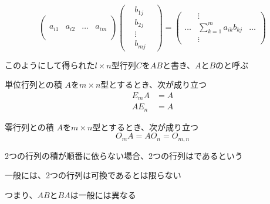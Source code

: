 \documentclass[../../../topic_linear-map]{subfiles}
\begin{document}
\begin{equation*}
  \begin{pmatrix}
           &        &       &        \\
           &        &       &        \\
    a_{i1} & a_{i2} & \dots & a_{im} \\
           &        &       &        \\
           &        &       &
  \end{pmatrix}
  \begin{pmatrix}
     & b_{1j} & \\
     & b_{2j} & \\
     & \vdots & \\
     & b_{mj} &
  \end{pmatrix} = \begin{pmatrix}
          & \vdots                                  &       \\
    \dots & \displaystyle\sum_{k=1}^m a_{ik} b_{kj} & \dots \\
          & \vdots                                  &
  \end{pmatrix}
\end{equation*}

\br

このようにして得られた$l \times n$型行列$C$を$AB$と書き、$A$と$B$のと呼ぶ

\sectionline

\begin{theorem}{単位行列との積}
  $A$を$m \times n$型とするとき、次が成り立つ
  \begin{align*}
    E_mA & = A \\
    AE_n & = A
  \end{align*}
\end{theorem}

\begin{theorem}{零行列との積}
  $A$を$m \times n$型とするとき、次が成り立つ
  \begin{equation*}
    O_m A = A O_n = O_{m,n}
  \end{equation*}
\end{theorem}

\sectionline

2つの行列の積が順番に依らない場合、2つの行列はであるという

\br

一般には、2つの行列は可換であるとは限らない

つまり、$AB$と$BA$は一般には異なる
\end{document}
